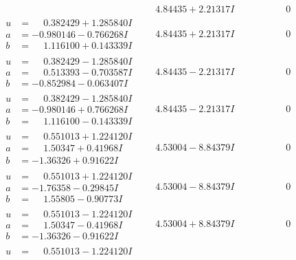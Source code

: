 \documentclass[1p]{elsarticle_modified}
\theoremstyle{definition}
\begin{document}
$$\begin{array}{c|c|c}
 & \phantom{-}4.84435 + 2.21317 I & \phantom{-0.000000 } 0 \\ \hline\begin{aligned}
u &= \phantom{-}0.382429 + 1.285840 I \\
a &= -0.980146 - 0.766268 I \\
b &= \phantom{-}1.116100 + 0.143339 I\end{aligned}
 & \phantom{-}4.84435 + 2.21317 I & \phantom{-0.000000 } 0 \\ \hline\begin{aligned}
u &= \phantom{-}0.382429 - 1.285840 I \\
a &= \phantom{-}0.513393 - 0.703587 I \\
b &= -0.852984 - 0.063407 I\end{aligned}
 & \phantom{-}4.84435 - 2.21317 I & \phantom{-0.000000 } 0 \\ \hline\begin{aligned}
u &= \phantom{-}0.382429 - 1.285840 I \\
a &= -0.980146 + 0.766268 I \\
b &= \phantom{-}1.116100 - 0.143339 I\end{aligned}
 & \phantom{-}4.84435 - 2.21317 I & \phantom{-0.000000 } 0 \\ \hline\begin{aligned}
u &= \phantom{-}0.551013 + 1.224120 I \\
a &= \phantom{-}1.50347 + 0.41968 I \\
b &= -1.36326 + 0.91622 I\end{aligned}
 & \phantom{-}4.53004 - 8.84379 I & \phantom{-0.000000 } 0 \\ \hline\begin{aligned}
u &= \phantom{-}0.551013 + 1.224120 I \\
a &= -1.76358 - 0.29845 I \\
b &= \phantom{-}1.55805 - 0.90773 I\end{aligned}
 & \phantom{-}4.53004 - 8.84379 I & \phantom{-0.000000 } 0 \\ \hline\begin{aligned}
u &= \phantom{-}0.551013 - 1.224120 I \\
a &= \phantom{-}1.50347 - 0.41968 I \\
b &= -1.36326 - 0.91622 I\end{aligned}
 & \phantom{-}4.53004 + 8.84379 I & \phantom{-0.000000 } 0 \\ \hline\begin{aligned}
u &= \phantom{-}0.551013 - 1.224120 I \\

\end{aligned}
\end{array}$$
\end{document}
